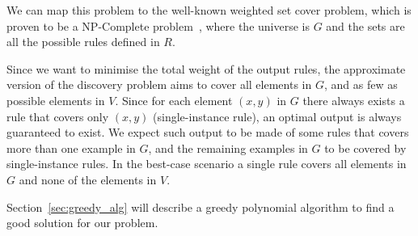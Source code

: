 We can map this problem to the well-known weighted set cover problem, which is proven to be a NP-Complete problem~\cite{chvatal1979greedy}, where the universe is $G$ and the sets are all the possible rules defined in $R$.

Since we want to minimise the total weight of the output rules, the approximate version of the discovery problem aims to cover all elements in $G$, and as few as possible elements in $V$. Since for each element $(x,y)$ in $G$ there always exists a rule that covers only $(x,y)$ (single-instance rule), an optimal output is always guaranteed to exist. We expect such output to be made of some rules that covers more than one example in $G$, and the remaining examples in $G$ to be covered by single-instance rules. In the best-case scenario a single rule covers all elements in $G$ and none of the elements in $V$.

Section~\ref{sec:greedy_alg} will describe a greedy polynomial algorithm to find a good solution for our problem.



